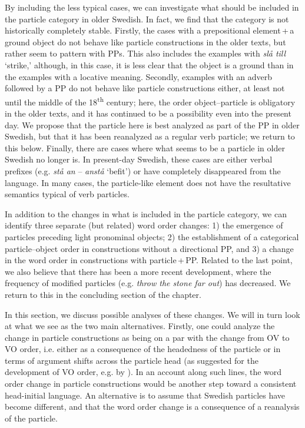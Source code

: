 \documentclass[output=paper]{langscibook}
\begin{document}
By including the less typical cases, we can investigate what should be included in the particle category in older Swedish. In fact, we find that the category is not historically completely stable. Firstly, the cases with a prepositional element\,+\,a ground object do not behave like particle constructions in the older texts, but rather seem to pattern with PPs. This also includes the examples with \textit{slå till} ‘strike,’ although, in this case, it is less clear that the object is a ground than in the examples with a locative meaning. Secondly, examples with an adverb followed by a PP do not behave like particle constructions either, at least not until the middle of the 18\textsuperscript{th} century; here, the order object–particle is obligatory in the older texts, and it has continued to be a possibility even into the present day. We propose that the particle here is best analyzed as part of the PP in older Swedish, but that it has been reanalyzed as a regular verb particle; we return to this below. Finally, there are cases where what seems to be a particle in older Swedish no longer is. In present-day Swedish, these cases are either verbal prefixes (e.g. \textit{stå an} – \textit{anstå} ‘befit’) or have completely disappeared from the language. In many cases, the particle-like element does not have the resultative semantics typical of verb particles. 



In addition to the changes in what is included in the particle category, we can identify three separate (but related) word order changes: 1) the emergence of particles preceding light pronominal objects; 2) the establishment of a categorical particle–object order in constructions without a directional PP, and 3) a change in the word order in constructions with particle\,+\,PP. Related to the last point, we also believe that there has been a more recent development, where the frequency of modified particles (e.g. \textit{throw the stone far out}) has decreased. We return to this in the concluding section of the chapter.



In this section, we discuss possible analyses of these changes. We will in turn look at what we see as the two main alternatives. Firstly, one could analyze the change in particle constructions as being on a par with the change from OV to VO order, i.e. either as a consequence of the headedness of the particle or in terms of argument shifts across the particle head (as suggested for the development of VO order, e.g. by \citealt{Petzell2011}). In an account along such lines, the word order change in particle constructions would be another step toward a consistent head-initial language. An alternative is to assume that Swedish particles have become different, and that the word order change is a consequence of a reanalysis of the particle. 
\end{document}
